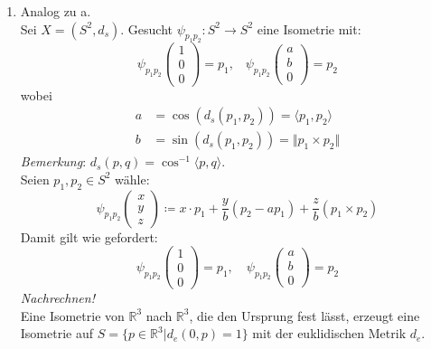 \begin{solution}
\begin{enumerate}[label= (\alph*)]
    
    \item Analog zu a. \\
    Sei \( X = (S^2, d_s) \). Gesucht \( \psi_{p_1p_2}: S^2 \to S^2 \) eine Isometrie mit:
    \begin{equation*}
      \psi_{p_1p_2} \left(\begin{smallmatrix}
        1 \\ 0 \\ 0
      \end{smallmatrix} \right) = p_1\text{,} \quad
      \psi_{p_1p_2} \left(\begin{smallmatrix}
        a \\ b \\ 0
      \end{smallmatrix} \right) = p_2
    \end{equation*} 
    wobei 
    \begin{align*}
      a &= \cos(d_s(p_1,p_2)) = \langle p_1, p_2 \rangle \\
      b &= \sin (d_s(p_1,p_2)) = \Vert p_1 \times p_2 \Vert
    \end{align*}
    \emph{Bemerkung}: \( d_s(p,q) = \cos^{-1} \langle p,q \rangle \). \\
    Seien \( p_1, p_2 \in S^2 \) wähle:
    \begin{equation*}
      \psi_{p_1 p_2}\left(\begin{smallmatrix}
        x \\ y \\ z
      \end{smallmatrix} \right) \coloneqq x \cdot p_1 + \frac{y}{b} (p_2-ap_1) + \frac{z}{b}(p_1 \times p_2)
    \end{equation*}
    Damit gilt wie gefordert: 
    \begin{equation*}
      \psi_{p_1p_2}\left(\begin{smallmatrix}
        1\\ 0 \\ 0
      \end{smallmatrix} \right) = p_1, \quad
      \psi_{p_1p_2}\left(\begin{smallmatrix}
        a \\ b \\ 0
      \end{smallmatrix} \right) = p_2
    \end{equation*}
    \emph{Nachrechnen!} \\
    Eine Isometrie von \( \mathbb{R}^3 \) nach \( \mathbb{R}^3 \), die den Ursprung fest lässt, erzeugt eine Isometrie auf \( S = \{ p \in \mathbb{R}^3 | d_e(0,p) = 1 \} \) mit der euklidischen Metrik \( d_e \). \\

\end{enumerate}
\end{solution}
